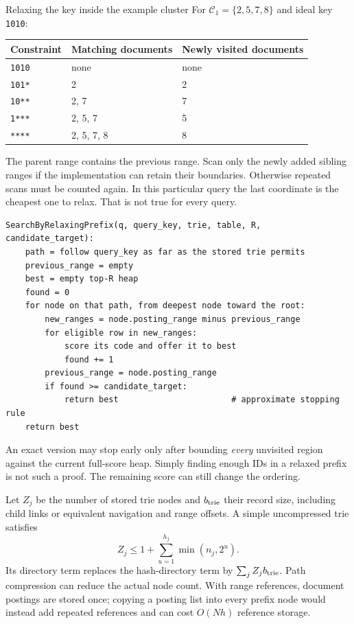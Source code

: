 \begin{examplebox}{Relaxing the key inside the example cluster}
For $\mathcal C_1=\{2,5,7,8\}$ and ideal key \texttt{1010}:
\begin{center}
\begin{tabular}{@{}lll@{}}\toprule
Constraint & Matching documents & Newly visited documents\\\midrule
\texttt{1010} & none & none\\
\texttt{101*} & 2 & 2\\
\texttt{10**} & 2, 7 & 7\\
\texttt{1***} & 2, 5, 7 & 5\\
\texttt{****} & 2, 5, 7, 8 & 8\\\bottomrule
\end{tabular}
\end{center}
The parent range contains the previous range. Scan only the newly added sibling ranges if the
implementation can retain their boundaries. Otherwise repeated scans must be counted again.
In this particular query the last coordinate is the cheapest one to relax. That is not true
for every query.
\end{examplebox}

\par\noindent\begin{minipage}{\linewidth}
\begin{lstlisting}[caption={A fixed-prefix relaxation variant of Approach C.}]
SearchByRelaxingPrefix(q, query_key, trie, table, R, candidate_target):
    path = follow query_key as far as the stored trie permits
    previous_range = empty
    best = empty top-R heap
    found = 0
    for node on that path, from deepest node toward the root:
        new_ranges = node.posting_range minus previous_range
        for eligible row in new_ranges:
            score its code and offer it to best
            found += 1
        previous_range = node.posting_range
        if found >= candidate_target:
            return best                       # approximate stopping rule
    return best
\end{lstlisting}
\end{minipage}\par
An exact version may stop early only after bounding \emph{every} unvisited region against the
current full-score heap. Simply finding enough IDs in a relaxed prefix is not such a proof.
The remaining score can still change the ordering.

Let $Z_j$ be the number of stored trie nodes and $b_{\rm trie}$ their record size, including
child links or equivalent navigation and range offsets. A simple uncompressed trie satisfies
\[
Z_j\leq 1+\sum_{u=1}^{h_j}\min(n_j,2^u).
\]
Its directory term replaces the hash-directory term by $\sum_j Z_jb_{\rm trie}$. Path compression
can reduce the actual node count. With range references, document postings are stored once;
copying a posting list into every prefix node would instead add repeated references and can
cost $O(Nh)$ reference storage.

